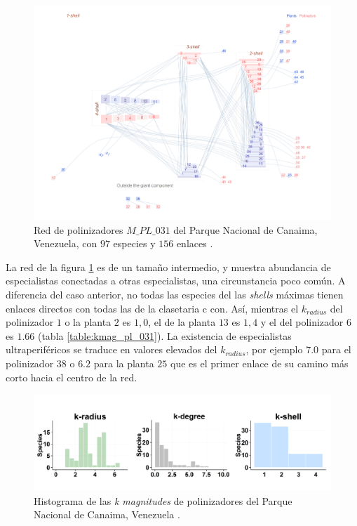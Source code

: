 \begin{figure}[h!]
\centering
\includegraphics[scale=0.14]{Figures/VIS_M_PL_031_ziggurat.png}
\caption {Red de polinizadores $M\_PL\_031$ del Parque Nacional de Canaima, Venezuela, con $97$ especies y $156$ enlaces \cite{ramirez1989biologia}.}
\label{fig:VIS_M_PL_031_ziggurat}
\end{figure}

La red de la figura \ref{fig:VIS_M_PL_031_ziggurat} es de un tamaño intermedio, y muestra abundancia de especialistas conectadas a otras especialistas, una circunstancia poco común. A diferencia del caso anterior, no todas las especies del las \textit{shells} máximas tienen enlaces directos con todas las de la clasetaria c con. Así, mientras el $k_{radius}$ del polinizador $1$ o la planta $2$ es $1,0$, el de la planta $13$ es $1,4$ y el del polinizador $6$ es $1.66$ (tabla \ref{table:kmag_pl_031}). La existencia de especialistas ultraperiféricos se traduce en valores elevados del $k_{radius}$, por ejemplo $7.0$ para el polinizador $38$ o $6.2$ para la planta $25$ que es el primer enlace de su camino más corto hacia el centro de la red.

\begin{figure}[ht!]
\centering
\includegraphics[scale=0.45]{Figures/VIS_M_PL_031_polar.png}
\caption {Histograma de las \textit{k magnitudes} de polinizadores del Parque Nacional de Canaima, Venezuela \cite{ramirez1989biologia}.}
\label{fig:VIS_M_PL_031_polar}
\end{figure}

